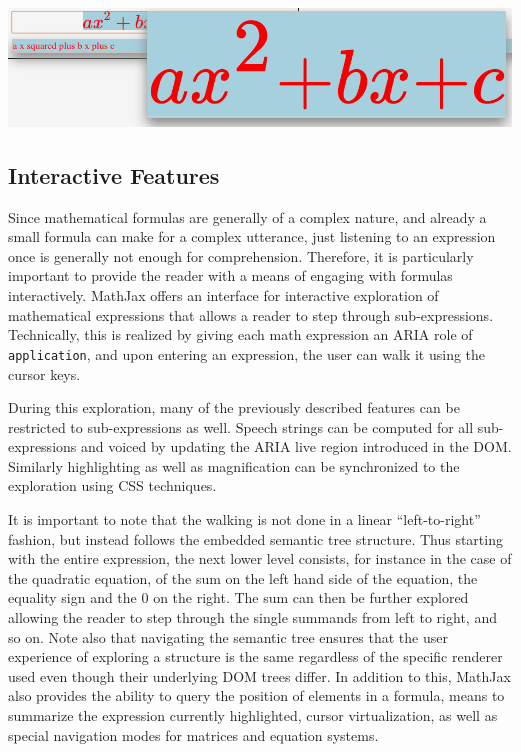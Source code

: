 \documentclass{sig-alternate}
\begin{document}
\begin{center}
  \includegraphics[width=.7\linewidth]{magnification}  
\end{center}


\subsection{Interactive Features}

Since mathematical formulas are generally of a complex nature, and already a
small formula can make for a complex utterance, just listening to an expression
once is generally not enough for comprehension. Therefore, it is particularly
important to provide the reader with a means of engaging with formulas
interactively. MathJax offers an interface for interactive exploration of
mathematical expressions that allows a reader to step through sub-expressions.
Technically, this is realized by giving each math expression an ARIA role of
\texttt{application}, and upon entering an expression, the user can walk it
using the cursor keys.

During this exploration, many of the previously described features can be
restricted to sub-expressions as well. Speech strings can be
computed for all sub-expressions and voiced by updating the ARIA live region
introduced in the DOM. Similarly highlighting as well as magnification can be
synchronized to the exploration using CSS techniques.

It is important to note that the walking is not done in a linear
``left-to-right'' fashion, but instead follows the embedded semantic tree
structure. Thus starting with the entire expression, the next lower level
consists, for instance in the case of the quadratic equation, of the sum on the
left hand side of the equation, the equality sign and the $0$ on the right.  The
sum can then be further explored allowing the reader to step through the single
summands from left to right, and so on.  Note also that navigating the semantic
tree ensures that the user experience of exploring a structure is the same
regardless of the specific renderer used even though their underlying DOM trees
differ.  In addition to this, MathJax also provides the ability to query the
position of elements in a formula, means to summarize the expression currently
highlighted, cursor virtualization, as well as special navigation modes for
matrices and equation systems.
\end{document}
